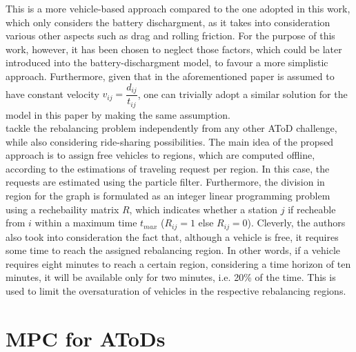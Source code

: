 This is a more vehicle-based approach compared to the one adopted in this work, which only considers the battery dischargment, as it takes into consideration various other aspects such as drag and rolling friction. For the purpose of this work, however, it has been chosen to neglect those factors, which could be later introduced into the battery-dischargment model, to favour a more simplistic approach. Furthermore, given that in the aforementioned paper is assumed to have constant velocity $v_{ij} = \dfrac{d_{ij}}{t_{ij}}$, one can trivially adopt a similar solution for the model in this paper by making the same assumption. \\
 tackle the rebalancing problem independently from any other AToD challenge, while also considering ride-sharing possibilities. The main idea of the propsed approach is to assign free vehicles to regions, which are computed offline, according to the estimations of traveling request per region. In this case, the requests are estimated using the particle filter. Furthermore, the division in region for the graph is formulated as an integer linear programming problem using a rechebaility matrix $R$, which indicates whether a station $j$ if recheable from $i$ within a maximum time $t_{max}$ ($R_{ij} = 1$ else $R_{ij} = 0$). Cleverly, the authors also took into consideration the fact that, although a vehicle is free, it requires some time to reach the assigned rebalancing region. In other words, if a vehicle requires eight minutes to reach a certain region, considering a time horizon of ten minutes, it will be available only for two minutes, i.e. 20\% of the time. This is used to limit the oversaturation of vehicles in the respective rebalancing regions.  
\section{MPC for AToDs}
